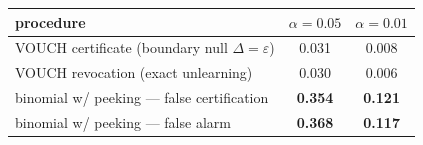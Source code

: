 \begin{tabular}{lcc}
\toprule
procedure & $\alpha=0.05$ & $\alpha=0.01$\\
\midrule
VOUCH certificate (boundary null $\Delta=\varepsilon$) & 0.031 & 0.008\\
VOUCH revocation (exact unlearning) & 0.030 & 0.006\\
binomial w/ peeking --- false certification & \textbf{0.354} & \textbf{0.121}\\
binomial w/ peeking --- false alarm & \textbf{0.368} & \textbf{0.117}\\
\bottomrule
\end{tabular}
